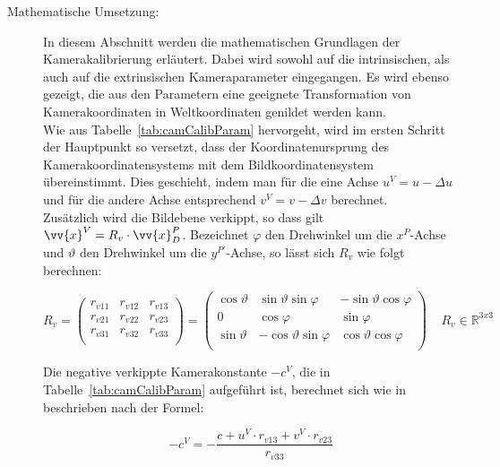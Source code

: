 \begin{description}
\item[Mathematische Umsetzung:] In diesem Abschnitt werden die mathematischen Grundlagen der Kamerakalibrierung erläutert. Dabei wird sowohl auf die intrinsischen, als auch auf die extrinsischen Kameraparameter eingegangen. Es wird ebenso gezeigt, die aus den Parametern eine geeignete Transformation von Kamerakoordinaten in Weltkoordinaten genildet werden kann.\\
 Wie aus Tabelle~\ref{tab:camCalibParam} hervorgeht, wird im ersten Schritt der Hauptpunkt so versetzt, dass der Koordinatenursprung des Kamerakoordinatensystems mit dem Bildkoordinatensystem übereinstimmt. Dies geschieht, indem man für die eine Achse $u^V = u - \Delta u$ und für die andere Achse entsprechend $v^V = v - \Delta v$ berechnet.\\
Zusätzlich wird die Bildebene verkippt, so dass gilt $\vv{x}^V = R_v \cdot \vv{x}^P_D$. Bezeichnet $\varphi$ den Drehwinkel um die $x^P$-Achse und $\vartheta$ den Drehwinkel um die $y^{P'}$-Achse, so lässt sich $R_v$ wie folgt berechnen:

\begin{equation}
\label{equ:Rverkippt}
R_v = 
\begin{pmatrix}
r_{v11} & r_{v12} & r_{v13} \\
r_{v21} & r_{v22} & r_{v23} \\
r_{v31} & r_{v32} & r_{v33} \\
\end{pmatrix} = 
\begin{pmatrix}
\cos\vartheta & \sin\vartheta \sin\varphi & -\sin\vartheta \cos\varphi \\
0 & \cos\varphi & \sin\varphi\\
\sin\vartheta & -\cos\vartheta \sin\varphi & \cos\vartheta \cos\varphi \\
\end{pmatrix} 
~ ~ ~ ~ ~R_v \in \mathbb{R}^{3x3}
\end{equation}

Die negative verkippte Kamerakonstante $-c^V$, die in Tabelle~\ref{tab:camCalibParam} aufgeführt ist, berechnet sich wie in~\citep{Meisel:77890} beschrieben nach der Formel:

\begin{equation}
-c^V = - \frac{c+u^V \cdot r_{v13} + v^V \cdot r_{v23}}{r_{v33}}
\end{equation}


\end{description}
